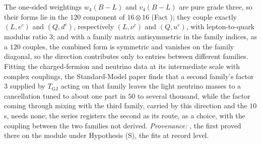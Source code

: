 The one-sided weightings $w_{4}(B - L)$ and $v_{4}(B - L)$ are pure grade three, so their forms lie in the $120$ component of $16 \otimes 16$ (Fact ); they couple exactly $(L, e^{c})$ and $(Q, d^{c})$, respectively $(L, \nu^{c})$ and $(Q, u^{c})$, with lepton-to-quark modulus ratio $3$; and with a family matrix antisymmetric in the family indices, as a $120$ couples, the combined form is symmetric and vanishes on the family diagonal, so the direction contributes only to entries between different families. Fitting the charged-fermion and neutrino data at its intermediate scale with complex couplings, the Standard-Model paper finds that a second family's factor $3$ supplied by $T_{\mathrm{GJ}}$ acting on that family leaves the light neutrino masses to a cancellation tuned to about one part in $50$ to several thousand, while the factor coming through mixing with the third family, carried by this direction and the $10$s, needs none; the series registers the second as its route, as a choice, with the coupling between the two families not derived. \emph{Provenance:} \cite[Prop.~11.6, Obs.~11.7, Rem.~11.8]{ButlerT12}, the first proved there on the module under Hypothesis (S), the fits at record level.

